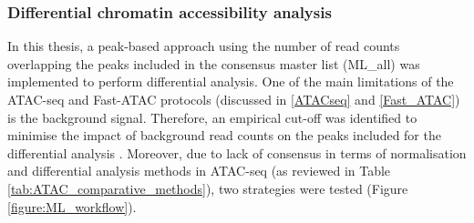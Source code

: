 

\subsubsection{Differential chromatin accessibility analysis}

In this thesis, a peak-based approach using the number of read counts overlapping the peaks included in the consensus master list (ML\_all) was implemented to perform differential analysis. One of the main limitations of the ATAC-seq and Fast-ATAC protocols (discussed in \ref{ATACseq} and \ref{Fast_ATAC}) is the background signal. Therefore, an empirical cut-off was identified to minimise the impact of background read counts on the peaks included for the differential analysis \parencite{Xinmin2005,Jonker2014}. Moreover, due to lack of consensus in terms of normalisation and differential analysis methods in ATAC-seq (as reviewed in Table \ref{tab:ATAC_comparative_methods}), two strategies were tested (Figure \ref{figure:ML_workflow}). 


